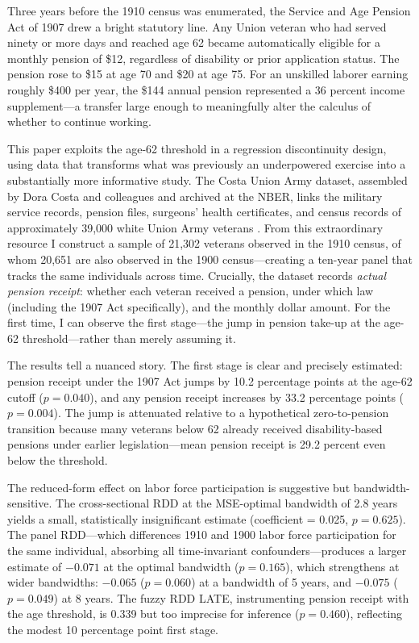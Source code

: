 \documentclass[12pt]{article}
\begin{document}
Three years before the 1910 census was enumerated, the Service and Age Pension Act of 1907 drew a bright statutory line. Any Union veteran who had served ninety or more days and reached age 62 became automatically eligible for a monthly pension of \$12, regardless of disability or prior application status. The pension rose to \$15 at age 70 and \$20 at age 75. For an unskilled laborer earning roughly \$400 per year, the \$144 annual pension represented a 36 percent income supplement---a transfer large enough to meaningfully alter the calculus of whether to continue working.

This paper exploits the age-62 threshold in a regression discontinuity design, using data that transforms what was previously an underpowered exercise into a substantially more informative study. The Costa Union Army dataset, assembled by Dora Costa and colleagues and archived at the NBER, links the military service records, pension files, surgeons' health certificates, and census records of approximately 39,000 white Union Army veterans \citep{costa1995pensions, fogel1993new}. From this extraordinary resource I construct a sample of 21,302 veterans observed in the 1910 census, of whom 20,651 are also observed in the 1900 census---creating a ten-year panel that tracks the same individuals across time. Crucially, the dataset records \textit{actual pension receipt}: whether each veteran received a pension, under which law (including the 1907 Act specifically), and the monthly dollar amount. For the first time, I can observe the first stage---the jump in pension take-up at the age-62 threshold---rather than merely assuming it.

The results tell a nuanced story. The first stage is clear and precisely estimated: pension receipt under the 1907 Act jumps by 10.2 percentage points at the age-62 cutoff ($p = 0.040$), and any pension receipt increases by 33.2 percentage points ($p = 0.004$). The jump is attenuated relative to a hypothetical zero-to-pension transition because many veterans below 62 already received disability-based pensions under earlier legislation---mean pension receipt is 29.2 percent even below the threshold.

The reduced-form effect on labor force participation is suggestive but bandwidth-sensitive. The cross-sectional RDD at the MSE-optimal bandwidth of 2.8 years yields a small, statistically insignificant estimate (coefficient = 0.025, $p = 0.625$). The panel RDD---which differences 1910 and 1900 labor force participation for the same individual, absorbing all time-invariant confounders---produces a larger estimate of $-0.071$ at the optimal bandwidth ($p = 0.165$), which strengthens at wider bandwidths: $-0.065$ ($p = 0.060$) at a bandwidth of 5 years, and $-0.075$ ($p = 0.049$) at 8 years. The fuzzy RDD LATE, instrumenting pension receipt with the age threshold, is 0.339 but too imprecise for inference ($p = 0.460$), reflecting the modest 10 percentage point first stage.
\end{document}
